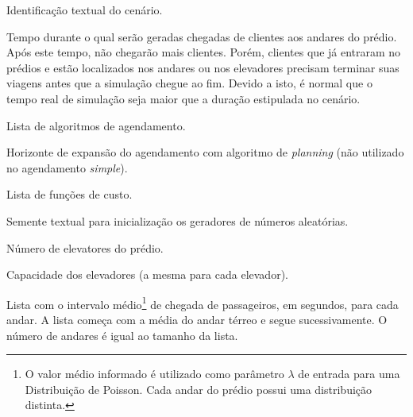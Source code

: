 \begin{description}[leftmargin=!,labelwidth=\widthof{\bfseries Função de Custo}]
  \item[Nome]

  Identificação textual do cenário.

  \item[Duração]

  Tempo durante o qual serão geradas chegadas de clientes aos andares do prédio.
  Após este tempo, não chegarão mais clientes. Porém, clientes que já entraram
  no prédios e estão localizados nos andares ou nos elevadores precisam terminar
  suas viagens antes que a simulação chegue ao fim. Devido a isto, é normal que
  o tempo real de simulação seja maior que a duração estipulada no cenário.

  \item[Agendamento]

  Lista de algoritmos de agendamento.

  \item[Horizonte]

  Horizonte de expansão do agendamento com algoritmo de \textit{planning} (não utilizado no agendamento \textit{simple}).

  \item[Função de Custo]

  Lista de funções de custo.

  \item[Semente]

  Semente textual para inicialização os geradores de números aleatórias.

  \item[Elevadores]

  Número de elevatores do prédio.

  \item[Capacidade]

  Capacidade dos elevadores (a mesma para cada elevador).

  \item[Andares]

  Lista com o intervalo médio\footnote{O valor médio informado é utilizado como
  parâmetro $\lambda$ de entrada para uma Distribuição de Poisson. Cada andar do
  prédio possui uma distribuição distinta.} de chegada de passageiros, em
  segundos, para cada andar. A lista começa com a média do andar térreo e segue
  sucessivamente. O número de andares é igual ao tamanho da lista.

\end{description}


